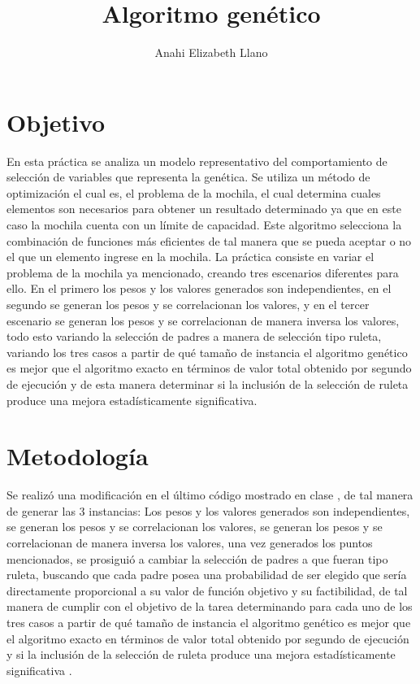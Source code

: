 \documentclass{article}
\begin{document}
\title{\textbf{Algoritmo gen\'etico}}
\author{Anahi Elizabeth Llano}

\maketitle

\section{Objetivo}\label{obj}

En esta pr\'actica se analiza un modelo representativo del comportamiento de selecci\'on de variables que representa la gen\'etica. Se utiliza un m\'etodo de optimizaci\'on el cual es, el problema de la mochila, el cual determina cuales elementos son necesarios para obtener un resultado determinado ya que en este caso la mochila cuenta con un l\'imite de capacidad. Este algoritmo selecciona la combinaci\'on de funciones m\'as eficientes de tal manera que se pueda aceptar o no el que un elemento ingrese en la mochila.
La pr\'actica \cite{elisa} consiste en variar el problema de la mochila ya mencionado, creando tres escenarios diferentes para ello. En el primero los pesos y los valores generados son independientes, en el segundo se generan los pesos y se correlacionan los valores, y en el tercer escenario se generan los pesos y se correlacionan de manera inversa los valores, todo esto variando la selecci\'on de padres a manera de selecci\'on tipo ruleta, variando los tres casos a partir de qu\'e tama\~no de instancia el algoritmo gen\'etico es mejor que el algoritmo exacto en t\'erminos de valor total obtenido por segundo de ejecuci\'on y de esta manera determinar si la inclusi\'on de la selecci\'on de ruleta produce una mejora estad\'isticamente significativa.


\section{Metodolog\'{i}a}\label{met}

Se realiz\'o una modificaci\'on en el \'ultimo c\'odigo mostrado en clase \citep{elisa}, de tal manera de generar las $3$ instancias:
Los pesos y los valores generados son independientes, se generan los pesos y se correlacionan los valores, se generan los pesos y se correlacionan de manera inversa los valores, una vez generados los puntos mencionados, se prosigui\'o a cambiar la selecci\'on de padres a que fueran tipo ruleta, buscando que cada padre posea una probabilidad de ser elegido que ser\'ia directamente proporcional a su valor de funci\'on objetivo y su factibilidad, de tal manera de cumplir con el objetivo de la tarea determinando para cada uno de los tres casos a partir de qu\'e tama\~no de instancia el algoritmo gen\'etico es mejor que el algoritmo exacto en t\'erminos de valor total obtenido por segundo de ejecuci\'on y si la inclusi\'on de la selecci\'on de ruleta produce una mejora estad\'isticamente significativa \citep{elisadisc}.
\end{document}
